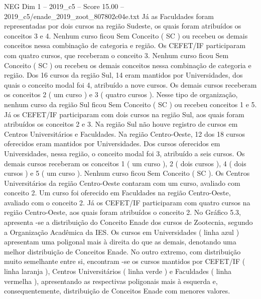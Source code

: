 \begin{textsample}{NEG Dim 1 – 2019\_c5 – Score 15.00 – 2019\_c5/enade\_2019\_zoot\_807802c04e.txt}
Já as Faculdades foram representadas por dois cursos na região Sudeste, os quais foram atribuídos os conceitos 3 e 4.
Nenhum curso ficou Sem Conceito ( SC ) ou recebeu os demais conceitos nessa combinação de categoria e região.
Os CEFET/IF participaram com quatro cursos, que receberam o conceito 3.
Nenhum curso ficou Sem Conceito ( SC ) ou recebeu os demais conceitos nessa combinação de categoria e região.
Dos 16 cursos da região Sul, 14 eram mantidos por Universidades, dos quais o conceito modal foi 4, atribuído a nove cursos.
Os demais cursos receberam os conceitos 2 ( um curso ) e 3 ( quatro cursos ).
Nesse tipo de organização, nenhum curso da região Sul ficou Sem Conceito ( SC ) ou recebeu conceitos 1 e 5.
Já os CEFET/IF participaram com dois cursos na região Sul, aos quais foram atribuídos os conceitos 2 e 3.
Na região Sul não houve registro de cursos em Centros Universitários e Faculdades.
Na região Centro-Oeste, 12 dos 18 cursos oferecidos eram mantidos por Universidades.
Dos cursos oferecidos em Universidades, nessa região, o conceito modal foi 3, atribuído a seis cursos.
Os demais cursos receberam os conceitos 1 ( um curso ), 2 ( dois cursos ), 4 ( dois cursos ) e 5 ( um curso ).
Nenhum curso ficou Sem Conceito ( SC ).
Os Centros Universitários da região Centro-Oeste contaram com um curso, avaliado com conceito 2.
Um curso foi oferecido em Faculdades na região Centro-Oeste, avaliado com o conceito 2.
Já os CEFET/IF participaram com quatro cursos na região Centro-Oeste, aos quais foram atribuídos o conceito 2.
No Gráfico 5.3, apresenta -se a distribuição do Conceito Enade dos cursos de Zootecnia, segundo a Organização Acadêmica da IES.
Os cursos em Universidades ( linha azul ) apresentam uma poligonal mais à direita do que as demais, denotando uma melhor distribuição de Conceitos Enade.
No outro extremo, com distribuição muito semelhante entre si, encontram -se os cursos mantidos por CEFET/IF ( linha laranja ), Centros Universitários ( linha verde ) e Faculdades ( linha vermelha ), apresentando as respectivas poligonais mais à esquerda e, consequentemente, distribuição de Conceitos Enade com menores valores.

\end{textsample}
